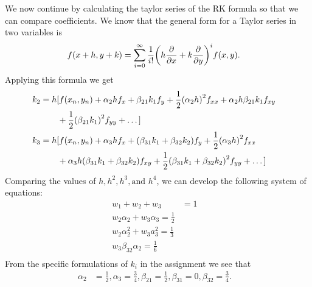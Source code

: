 \documentclass[12pt]{article}
\DeclarePairedDelimiter\rb{(}{)}
\begin{document}
\begin{enumerate}[label=(\alph*)]
        We now continue by calculating the taylor series of the RK formula so that we can compare coefficients. We know that the general form for a Taylor series in two variables is 
        \begin{align*}
            f \rb*{x + h, y + k} & =  \sum_{i = 0}^{\infty} {\frac{1}{i!} \rb*{ h \frac{\partial }{\partial x} + k \frac{\partial }{\partial y}}^{i} f \rb*{x,y}}.  &\\
        \end{align*}
        Applying this formula we get
        \begin{align*}
            k_{2} & =  h [ f \rb*{x_{n}, y_{n}} + \alpha_{2} h f_{x} + \beta_{21} k_{1} f_{y} + \frac{1}{2} \rb*{ \alpha_{2} h}^{2} f_{xx}
            + \alpha_{2} h \beta_{21} k_{1} f_{xy} &\\
            & \hspace{20pt}+ \frac{1}{2} \rb*{\beta_{21} k_{1}}^{2} f_{yy} + \dots  ] &\\
            k_{3} & =  h [ f \rb*{x_{n}, y_{n}} + \alpha_{3} h f_{x} + \rb*{\beta_{31} k_{1} + \beta_{32} k_{2}} f_{y} 
            + \frac{1}{2} \rb*{\alpha_{3} h }^{2} f_{xx} &\\
             & \hspace{20px}+ \alpha_{3} h \rb*{ \beta_{31} k_{1} + \beta_{32} k_{2}} f_{xy}
            + \frac{1}{2} \rb*{ \beta_{31}k_{1} + \beta_{32} k_{2}}^{2} f_{yy} + \dots  ]&\\
        \end{align*}
        Comparing the values of \(h, h^{2}, h^{3}, \text{and } h^{4}\), we can develop the following system of equations: 
        \begin{align*}
            w_{1} + w_{2} + w_{3} & =  1 &\\
            w_{2} \alpha_{2} + w_{3} \alpha_{3} = \frac{1}{2} &\\
            w_{2} \alpha_{2}^{2} + w_{3} a_{3}^{2} = \frac{1}{3} &\\
            w_{3} \beta_{32} \alpha_{2} = \frac{1}{6} &\\
        \end{align*}
        From the specific formulations of \(k_{i}\) in the assignment we see that 
        \begin{align*}
            \alpha_{2} & =  \frac{1}{2}, \alpha_{3}  = \frac{3}{4}
            , \beta_{21} = \frac{1}{2}, \beta_{31} = 0, 
            \beta_{32} = \frac{3}{4}. &\\
        \end{align*}

\end{enumerate}
\end{document}
